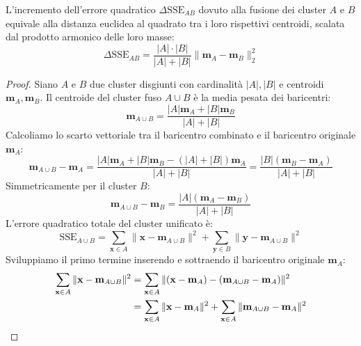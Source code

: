 \begin{theorem}
L'incremento dell'errore quadratico $\Delta \mathrm{SSE}_{AB}$ dovuto alla fusione dei cluster $A$ e $B$ equivale alla distanza euclidea al quadrato tra i loro rispettivi centroidi, scalata dal prodotto armonico delle loro masse:
\begin{equation}
    \Delta \mathrm{SSE}_{AB} = \frac{|A| \cdot |B|}{|A| + |B|} \|\mathbf{m}_A - \mathbf{m}_B\|_2^2
    \label{eq:dm-ward-formula-closed}
\end{equation}
\end{theorem}

\begin{proof}
Siano $A$ e $B$ due cluster disgiunti con cardinalità $|A|, |B|$ e centroidi $\mathbf{m}_A, \mathbf{m}_B$. Il centroide del cluster fuso $A \cup B$ è la media pesata dei baricentri:
\begin{equation}
    \mathbf{m}_{A \cup B} = \frac{|A| \mathbf{m}_A + |B| \mathbf{m}_B}{|A| + |B|}
\end{equation}
Calcoliamo lo scarto vettoriale tra il baricentro combinato e il baricentro originale $\mathbf{m}_A$:
\begin{equation}
    \mathbf{m}_{A \cup B} - \mathbf{m}_A = \frac{|A|\mathbf{m}_A + |B|\mathbf{m}_B - (|A|+|B|)\mathbf{m}_A}{|A| + |B|} = \frac{|B|(\mathbf{m}_B - \mathbf{m}_A)}{|A| + |B|}
\end{equation}
Simmetricamente per il cluster $B$:
\begin{equation}
    \mathbf{m}_{A \cup B} - \mathbf{m}_B = \frac{|A|(\mathbf{m}_A - \mathbf{m}_B)}{|A| + |B|}
\end{equation}
L'errore quadratico totale del cluster unificato è:
\begin{equation}
    \mathrm{SSE}_{A \cup B} = \sum_{\mathbf{x} \in A} \|\mathbf{x} - \mathbf{m}_{A \cup B}\|^2 + \sum_{\mathbf{y} \in B} \|\mathbf{y} - \mathbf{m}_{A \cup B}\|^2
\end{equation}
Sviluppiamo il primo termine inserendo e sottraendo il baricentro originale $\mathbf{m}_A$:
\begin{align}
    \sum_{\mathbf{x} \in A} \|\mathbf{x} - \mathbf{m}_{A \cup B}\|^2 &= \sum_{\mathbf{x} \in A} \|(\mathbf{x} - \mathbf{m}_A) - (\mathbf{m}_{A \cup B} - \mathbf{m}_A)\|^2 \notag \\
    &= \sum_{\mathbf{x} \in A} \|\mathbf{x} - \mathbf{m}_A\|^2 + \sum_{\mathbf{x} \in A} \|\mathbf{m}_{A \cup B} - \mathbf{m}_A\|^2 \notag \\

\end{align}
\end{proof}
